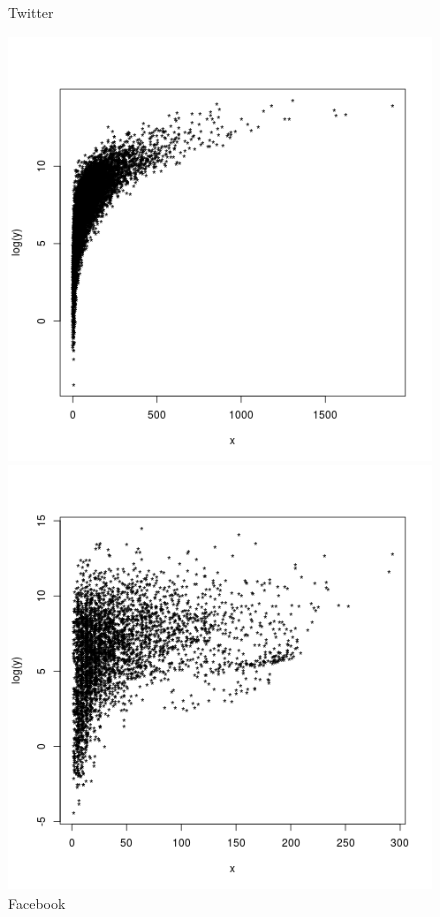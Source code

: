 \documentclass[palatino]{apuntes}
\begin{document}
\begin{figure}[h!] 
\centering 
\begin{minipage}[b]{0.4\textwidth}
	\caption{Twitter}
	\includegraphics[scale=0.45]{img/twitter_grado-betweeness}
\end{minipage}
\hfill
\begin{minipage}[b]{0.4\textwidth}
	\caption{Facebook}
	\includegraphics[scale=0.45]{img/fb_grado-betweeness}
\end{minipage}
\end{figure} 
\end{document}
